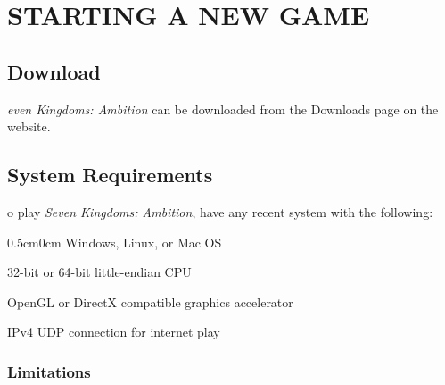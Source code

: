 
\chapter[Starting a New Game]{{\Huge S}TARTING A {\Huge N}EW {\Huge G}AME}

\section{Download}

\textit{even Kingdoms: Ambition} can be downloaded from the
Downloads page on the website.


\section{System Requirements}


o play \textit{Seven Kingdoms: Ambition}, have any recent
system with the following:

\begin{changemargin}{0.5cm}{0cm} 
Windows, Linux, or Mac OS

32-bit or 64-bit little-endian CPU

OpenGL or DirectX compatible graphics accelerator

IPv4 UDP connection for internet play
\end{changemargin}

\subsection{Limitations}

